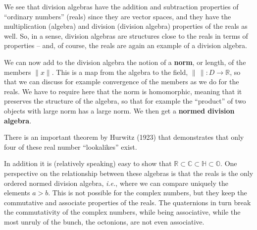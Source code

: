 \documentclass[notes.tex]{subfiles}
\begin{document}
We see that division algebras have the addition and subtraction properties of ``ordinary numbers'' (reals) since they are vector spaces, and they have the  multiplication (algebra) and division (division algebra) properties of the reals as well. So, in a sense, division algebras are structures close to the reals in terms of properties -- and, of course, the reals are again an example of a division algebra. 

We can now add to the division algebra the notion of a {\bf norm}, or length, of the members $\|x\|$. This is a map from the algebra to the field, $\|\,\|:D\to\mathbb{R}$, so that we can discuss for example convergence of the members as we do for the reals. We have to require here that the norm is homomorphic, meaning that it preserves the structure of the algebra, so that for example the ``product''  of two objects with large norm has a large norm. We then get a {\bf normed division algebra}. 

There is an important theorem by Hurwitz (1923) that demonstrates that only four of these real number ``lookalikes'' exist.

In addition it is (relatively speaking) easy to show that $\mathbb{R} \subset\mathbb{C}\subset\mathbb{H}\subset\mathbb{O}$. One perspective on the relationship between these algebras is that the reals is the only ordered normed division algebra, {\it i.e.}, where we can compare uniquely the elements $a>b$. This is not possible for the complex numbers, but they keep the commutative and associate properties of the reals. The quaternions in turn break the commutativity of the complex numbers, while being associative, while the most unruly of the bunch, the octonions, are not even associative.


\end{document}
